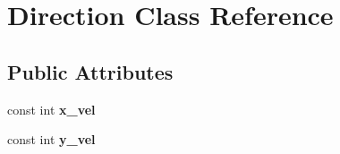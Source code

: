 \hypertarget{class_direction}{}\section{Direction Class Reference}
\label{class_direction}
\subsection*{Public Attributes}
\begin{DoxyCompactItemize}
\item 
\hypertarget{class_direction_ad1ddaa30789ac5c419014144b30ac7c9}{}\label{class_direction_ad1ddaa30789ac5c419014144b30ac7c9} 
const int {\bfseries x\+\_\+vel}
\item 
\hypertarget{class_direction_a4e06a7192a2abd4a84f2d7be556e5111}{}\label{class_direction_a4e06a7192a2abd4a84f2d7be556e5111} 
const int {\bfseries y\+\_\+vel}
\end{DoxyCompactItemize}
